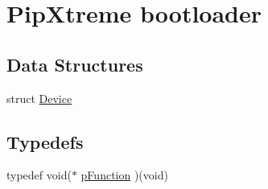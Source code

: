 \hypertarget{group___pip_xtreme_b_l}{\section{\-Pip\-Xtreme bootloader}
\label{group___pip_xtreme_b_l}
}
\subsection*{\-Data \-Structures}
\begin{DoxyCompactItemize}
\item 
struct \hyperlink{struct_device}{\-Device}
\end{DoxyCompactItemize}
\subsection*{\-Typedefs}
\begin{DoxyCompactItemize}
\item 
typedef void($\ast$ \hyperlink{group___pip_xtreme_b_l_ga9227bf1f1a9c633a0cc9ca50cc761c1a}{p\-Function} )(void)
\end{DoxyCompactItemize}

